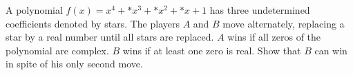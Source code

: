 A polynomial $f(x) = x^4 + {*}x^3 + {*}x^2 + {*}x + 1$ has three undetermined coefficients denoted by stars. The players $A$ and $B$ move alternately, replacing a star by a real number until all stars are replaced. $A$ wins if all zeros of the polynomial are complex. $B$ wins if at least one zero is real. Show that $B$ can win in spite of his only second move.
